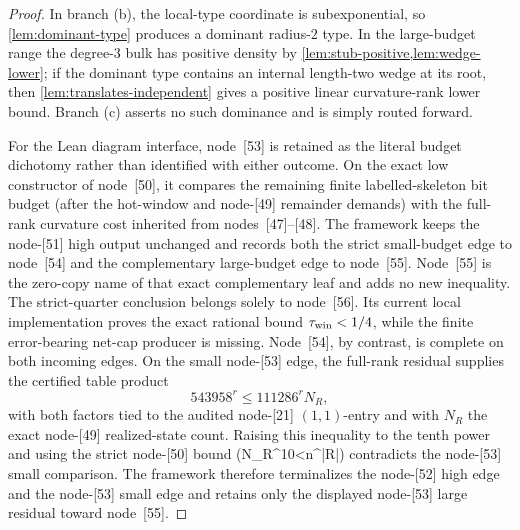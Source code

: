 \documentclass[11pt]{article}
\begin{document}
\begin{proof}
In branch (b), the local-type coordinate is subexponential, so
\cref{lem:dominant-type} produces a dominant radius-$2$ type.  In the
large-budget range the degree-$3$ bulk has positive density by
\cref{lem:stub-positive,lem:wedge-lower}; if the dominant type contains an
internal length-two wedge at its root, then
\cref{lem:translates-independent} gives a positive linear curvature-rank lower
bound.  Branch (c) asserts no such dominance and is simply routed forward.

For the Lean diagram interface, node~[53] is retained as the literal budget
dichotomy rather than identified with either outcome.  On the exact low
constructor of node~[50], it compares the remaining finite labelled-skeleton
bit budget (after the hot-window and node-[49] remainder demands) with the
full-rank curvature cost inherited from nodes~[47]--[48].  The framework keeps
the node-[51] high output unchanged and records both the strict small-budget
edge to node~[54] and the complementary large-budget edge to node~[55].
Node~[55] is the zero-copy name of that exact complementary leaf and adds no
new inequality.  The strict-quarter conclusion belongs solely to node~[56].
Its current local implementation proves the exact rational bound
\(\tau_{\rm win}<1/4\), while the finite error-bearing net-cap producer is
missing.  Node~[54], by contrast, is complete on both incoming edges.  On the
small node-[53] edge, the full-rank residual supplies the certified table
product
\[
  543958^r\le 111286^r N_R,
\]
with both factors tied to the audited node-[21] \((1,1)\)-entry and with
\(N_R\) the exact node-[49] realized-state count.  Raising this inequality to
the tenth power and using the strict node-[50] bound (N_R^{10}<n^{|R|})
contradicts the node-[53] small comparison.  The framework therefore
terminalizes the node-[52] high edge and the node-[53] small edge and retains
only the displayed node-[53] large residual toward node~[55].
\end{proof}
\end{document}
